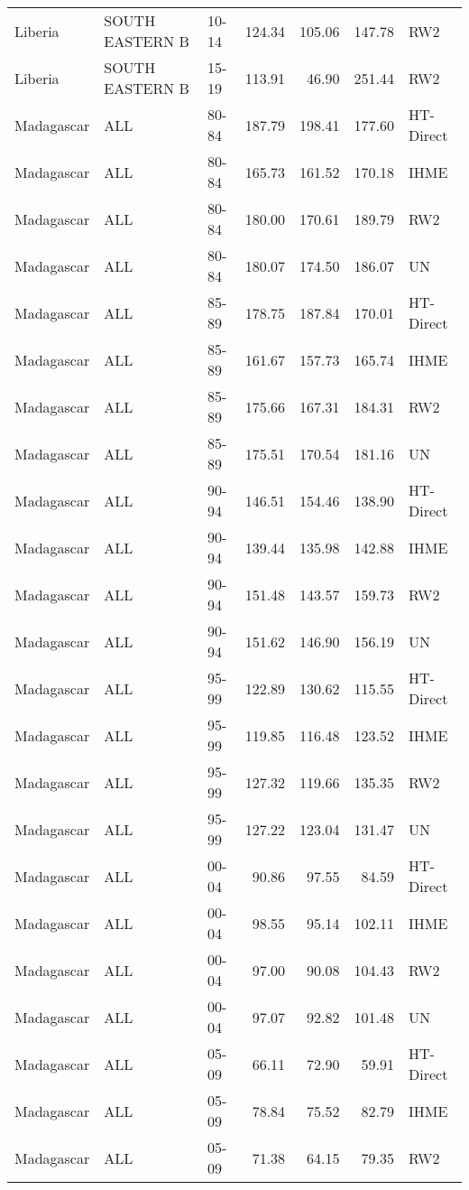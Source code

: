 \begin{longtable}{lllrrrl}
  Liberia & SOUTH EASTERN B & 10-14 & 124.34 & 105.06 & 147.78 & RW2 \\ 
  Liberia & SOUTH EASTERN B & 15-19 & 113.91 & 46.90 & 251.44 & RW2 \\ 
  Madagascar & ALL & 80-84 & 187.79 & 198.41 & 177.60 & HT-Direct \\ 
  Madagascar & ALL & 80-84 & 165.73 & 161.52 & 170.18 & IHME \\ 
  Madagascar & ALL & 80-84 & 180.00 & 170.61 & 189.79 & RW2 \\ 
  Madagascar & ALL & 80-84 & 180.07 & 174.50 & 186.07 & UN \\ 
  Madagascar & ALL & 85-89 & 178.75 & 187.84 & 170.01 & HT-Direct \\ 
  Madagascar & ALL & 85-89 & 161.67 & 157.73 & 165.74 & IHME \\ 
  Madagascar & ALL & 85-89 & 175.66 & 167.31 & 184.31 & RW2 \\ 
  Madagascar & ALL & 85-89 & 175.51 & 170.54 & 181.16 & UN \\ 
  Madagascar & ALL & 90-94 & 146.51 & 154.46 & 138.90 & HT-Direct \\ 
  Madagascar & ALL & 90-94 & 139.44 & 135.98 & 142.88 & IHME \\ 
  Madagascar & ALL & 90-94 & 151.48 & 143.57 & 159.73 & RW2 \\ 
  Madagascar & ALL & 90-94 & 151.62 & 146.90 & 156.19 & UN \\ 
  Madagascar & ALL & 95-99 & 122.89 & 130.62 & 115.55 & HT-Direct \\ 
  Madagascar & ALL & 95-99 & 119.85 & 116.48 & 123.52 & IHME \\ 
  Madagascar & ALL & 95-99 & 127.32 & 119.66 & 135.35 & RW2 \\ 
  Madagascar & ALL & 95-99 & 127.22 & 123.04 & 131.47 & UN \\ 
  Madagascar & ALL & 00-04 & 90.86 & 97.55 & 84.59 & HT-Direct \\ 
  Madagascar & ALL & 00-04 & 98.55 & 95.14 & 102.11 & IHME \\ 
  Madagascar & ALL & 00-04 & 97.00 & 90.08 & 104.43 & RW2 \\ 
  Madagascar & ALL & 00-04 & 97.07 & 92.82 & 101.48 & UN \\ 
  Madagascar & ALL & 05-09 & 66.11 & 72.90 & 59.91 & HT-Direct \\ 
  Madagascar & ALL & 05-09 & 78.84 & 75.52 & 82.79 & IHME \\ 
  Madagascar & ALL & 05-09 & 71.38 & 64.15 & 79.35 & RW2 \\ 

\end{longtable}

